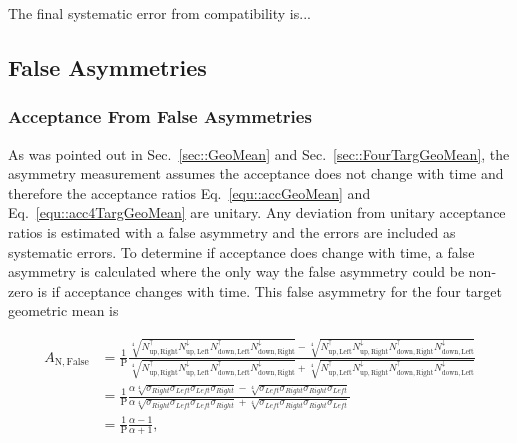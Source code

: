 \noindent
The final systematic error from compatibility is...

\subsection{False Asymmetries}
\subsubsection{Acceptance From False Asymmetries}
As was pointed out in Sec.~\ref{sec::GeoMean} and
Sec.~\ref{sec::FourTargGeoMean}, the asymmetry measurement assumes the
acceptance does not change with time and therefore the acceptance ratios
Eq.~\ref{equ::accGeoMean} and Eq.~\ref{equ::acc4TargGeoMean} are unitary.  Any
deviation from unitary acceptance ratios is estimated with a false asymmetry and
the errors are included as systematic errors.  To determine if acceptance does
change with time, a false asymmetry is calculated where the only way the false
asymmetry could be non-zero is if acceptance changes with time.  This false
asymmetry for the four target geometric mean is

\begin{equation}
  \label{eqn::falseAcc}
  \begin{split}
    A_{\mathrm{N,False}} &= 
    \frac{1}{\mathrm{P}}
    \frac{
      \sqrt[4]{
        N_{\mathrm{up,Right}}^{\uparrow}N_{\mathrm{up, Left}}^{\downarrow}
        N_{\mathrm{down,Left}}^{\uparrow}N_{\mathrm{down, Right}}^{\downarrow}
      } -
      \sqrt[4]{
        N_{\mathrm{up,Left}}^{\uparrow}N_{\mathrm{up, Right}}^{\downarrow}
        N_{\mathrm{down,Right}}^{\uparrow}N_{\mathrm{down, Left}}^{\downarrow}
      }
    }{
      \sqrt[4]{
        N_{\mathrm{up,Right}}^{\uparrow}N_{\mathrm{up, Left}}^{\downarrow}
        N_{\mathrm{down,Left}}^{\uparrow}N_{\mathrm{down, Right}}^{\downarrow}
      } +
      \sqrt[4]{
        N_{\mathrm{up,Left}}^{\uparrow}N_{\mathrm{up, Right}}^{\downarrow}
        N_{\mathrm{down,Right}}^{\uparrow}N_{\mathrm{down, Left}}^{\downarrow}
      }
    }\\
    & =
    \frac{1}{\mathrm{P}}
    \frac{
      \alpha \sqrt[4]{\sigma_{Right}\sigma_{Left}\sigma_{Left}\sigma_{Right}} -
      \sqrt[4]{\sigma_{Left}\sigma_{Right}\sigma_{Right}\sigma_{Left}}
    }{
      \alpha \sqrt[4]{\sigma_{Right}\sigma_{Left}\sigma_{Left}\sigma_{Right}} +
      \sqrt[4]{\sigma_{Left}\sigma_{Right}\sigma_{Right}\sigma_{Left}}
    }\\
    & =
    \frac{1}{\mathrm{P}}
    \frac{
      \alpha - 1     
    }{
      \alpha + 1
    },
  \end{split}
\end{equation}

